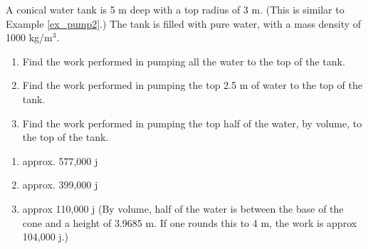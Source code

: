 {A conical water tank is 5 m deep with a top radius of 3 m. (This is similar to Example \ref{ex_pump2}.) The tank is filled with pure water, with a mass density of 1000 kg/m$^3$. 
	\begin{enumerate}
	\item		Find the work performed in pumping all the water to the top of the tank.
	\item		Find the work performed in pumping the top 2.5 m of water to the top of the tank.
	\item		Find the work performed in pumping the top half of the water, by volume, to the top of the tank.
	\end{enumerate}
}
{\begin{enumerate}
\item	approx. 577,000 j
\item	approx. 399,000 j
\item	approx 110,000 j  (By volume, half of the water is between the base of the cone and a height of 3.9685 m. If one rounds this to 4 m, the work is approx 104,000 j.)
\end{enumerate}
}
